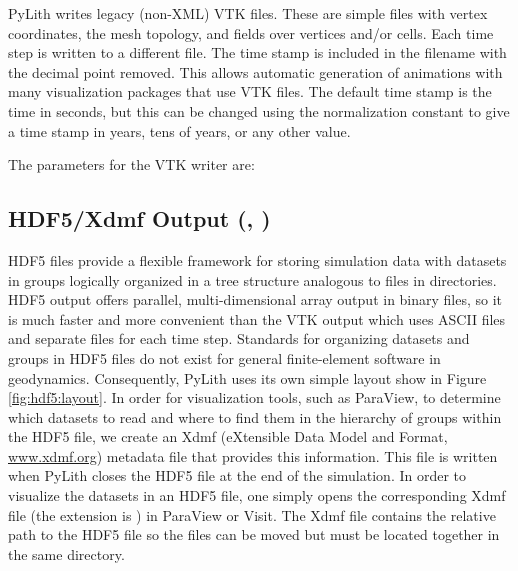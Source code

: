 PyLith writes legacy (non-XML) VTK files. These are simple files with
vertex coordinates, the mesh topology, and fields over vertices and/or
cells. Each time step is written to a different file. The time stamp
is included in the filename with the decimal point removed. This allows
automatic generation of animations with many visualization packages
that use VTK files. The default time stamp is the time in seconds,
but this can be changed using the normalization constant to give a
time stamp in years, tens of years, or any other value.


The parameters for the VTK writer are:
\begin{inventory}
\end{inventory}

\subsection{HDF5/Xdmf Output (, )}
\label{sub:HDF5/Xdmf-Output}

HDF5 files provide a flexible framework for storing simulation data
with datasets in groups logically organized in a tree structure analogous
to files in directories. HDF5 output offers parallel, multi-dimensional
array output in binary files, so it is much faster and more convenient
than the VTK output which uses ASCII files and separate files for
each time step. Standards for organizing datasets and groups in HDF5
files do not exist for general finite-element software in geodynamics.
Consequently, PyLith uses its own simple layout show in Figure \vref{fig:hdf5:layout}.
In order for visualization tools, such as ParaView, to determine which
datasets to read and where to find them in the hierarchy of groups
within the HDF5 file, we create an Xdmf (eXtensible Data Model and
Format, \url{www.xdmf.org}) metadata file that provides this information.
This file is written when PyLith closes the HDF5 file at the end of
the simulation. In order to visualize the datasets in an HDF5 file,
one simply opens the corresponding Xdmf file (the extension is )
in ParaView or Visit. The Xdmf file contains the relative path to
the HDF5 file so the files can be moved but must be located together
in the same directory. 

